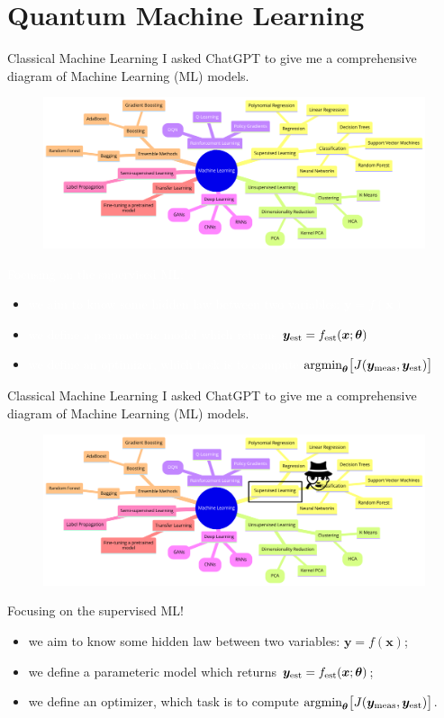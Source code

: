\documentclass[aspectratio=169, 8pt, xcolor={svgnames}, hyperref={linkcolor=black}]{beamer}
\begin{document}
\section{Quantum Machine Learning}

\begin{frame}{Classical Machine Learning}
I asked ChatGPT to give me a comprehensive diagram of Machine Learning (ML) models.
\begin{figure}
   \includegraphics[width=0.7\linewidth, height=0.5\textheight]{figures/ml.png}
\end{figure}  
\textcolor{white}{Focusing on the supervised ML:}
\begin{itemize}[noitemsep]
\item[] \textcolor{white}{we aim to know some hidden law between two variables: $\bm{y}=f(\bm{x})$}
\item[] \textcolor{white}{we define a parameteric model which returns $\bm{y}_{\rm est}=f_{\rm est}(\bm{x}; \bm{\theta})$}
\item[] \textcolor{white}{we define an optimizer, which task is to compute} 
   \textcolor{white}{$\text{argmin}_{\bm{\theta}}\bigl[J(\bm{y}_{\rm meas}, \bm{y}_{\rm est})\bigr]$}
\end{itemize}
\end{frame}

\begin{frame}{Classical Machine Learning}
I asked ChatGPT to give me a comprehensive diagram of Machine Learning (ML) models.
\begin{figure}
   \includegraphics[width=0.7\linewidth, height=0.5\textheight]{figures/supervised.png}
\end{figure}  
Focusing on the supervised ML!
\begin{itemize}[noitemsep]
\item[\faCrosshairs] we aim to know some hidden law between two variables: $\bm{y}=f(\bm{x})$;
\item[\faBarChart] we define a parameteric model which returns $\bm{y}_{\rm est}=f_{\rm est}(\bm{x}; \bm{\theta})$;
\item[\faBinoculars] we define an optimizer, which task is to compute 
   $\text{argmin}_{\bm{\theta}}\bigl[J(\bm{y}_{\rm meas}, \bm{y}_{\rm est})\bigr]$.
\end{itemize}
\end{frame}
\end{document}
